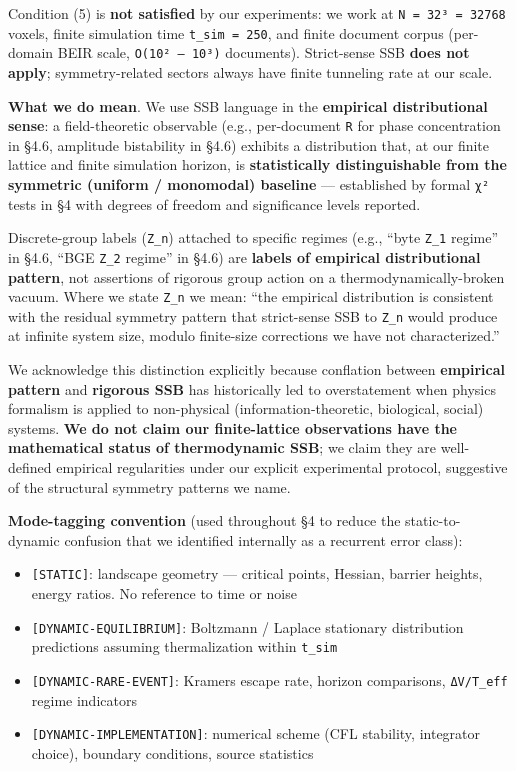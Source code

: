 \documentclass[
]{article}
\providecommand{\tightlist}{%
  \setlength{\itemsep}{0pt}\setlength{\parskip}{0pt}}
\begin{document}
Condition (5) is \textbf{not satisfied} by our experiments: we work at
\texttt{N\ =\ 32³\ =\ 32768} voxels, finite simulation time
\texttt{t\_sim\ =\ 250}, and finite document corpus (per-domain BEIR
scale, \texttt{O(10²\ –\ 10³)} documents). Strict-sense SSB \textbf{does
not apply}; symmetry-related sectors always have finite tunneling rate
at our scale.

\textbf{What we do mean}. We use SSB language in the \textbf{empirical
distributional sense}: a field-theoretic observable (e.g., per-document
\texttt{\textbar{}R\textbar{}} for phase concentration in §4.6,
amplitude bistability in §4.6) exhibits a distribution that, at our
finite lattice and finite simulation horizon, is \textbf{statistically
distinguishable from the symmetric (uniform / monomodal) baseline} ---
established by formal \texttt{χ²} tests in §4 with degrees of freedom
and significance levels reported.

Discrete-group labels (\texttt{Z\_n}) attached to specific regimes
(e.g., ``byte \texttt{Z\_1} regime'' in §4.6, ``BGE \texttt{Z\_2}
regime'' in §4.6) are \textbf{labels of empirical distributional
pattern}, not assertions of rigorous group action on a
thermodynamically-broken vacuum. Where we state \texttt{Z\_n} we mean:
``the empirical distribution is consistent with the residual symmetry
pattern that strict-sense SSB to \texttt{Z\_n} would produce at infinite
system size, modulo finite-size corrections we have not characterized.''

We acknowledge this distinction explicitly because conflation between
\textbf{empirical pattern} and \textbf{rigorous SSB} has historically
led to overstatement when physics formalism is applied to non-physical
(information-theoretic, biological, social) systems. \textbf{We do not
claim our finite-lattice observations have the mathematical status of
thermodynamic SSB}; we claim they are well-defined empirical
regularities under our explicit experimental protocol, suggestive of the
structural symmetry patterns we name.

\textbf{Mode-tagging convention} (used throughout §4 to reduce the
static-to-dynamic confusion that we identified internally as a recurrent
error class):

\begin{itemize}
\tightlist
\item
  \texttt{{[}STATIC{]}}: landscape geometry --- critical points,
  Hessian, barrier heights, energy ratios. No reference to time or noise
\item
  \texttt{{[}DYNAMIC-EQUILIBRIUM{]}}: Boltzmann / Laplace stationary
  distribution predictions assuming thermalization within
  \texttt{t\_sim}
\item
  \texttt{{[}DYNAMIC-RARE-EVENT{]}}: Kramers escape rate, horizon
  comparisons, \texttt{ΔV/T\_eff} regime indicators
\item
  \texttt{{[}DYNAMIC-IMPLEMENTATION{]}}: numerical scheme (CFL
  stability, integrator choice), boundary conditions, source statistics
\end{itemize}
\end{document}
